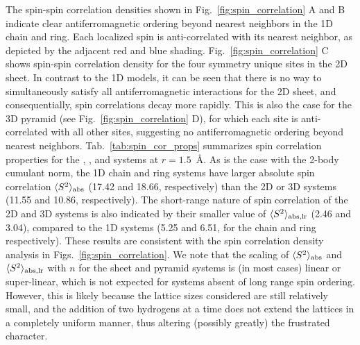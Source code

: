 \documentclass[aip,jcp,amsmath,amssymb, reprint]{revtex4-1}
\begin{document}
The spin-spin correlation densities shown in Fig.~\ref{fig:spin_correlation} A and B indicate clear  antiferromagnetic ordering beyond nearest neighbors in the 1D chain and ring.
Each localized spin is anti-correlated with its nearest neighbor, as depicted by the adjacent red and blue shading. 
Fig.~\ref{fig:spin_correlation} C shows spin-spin correlation density for the four symmetry unique sites in the 2D sheet. 
In contrast to the 1D models, it can be seen that there is no way to simultaneously satisfy all antiferromagnetic interactions for the 2D sheet, and consequentially, spin correlations decay more rapidly. 
This is also the case for the 3D pyramid (see Fig.~\ref{fig:spin_correlation} D), for which each site is anti-correlated with all other sites, suggesting no antiferromagnetic ordering beyond nearest neighbors.
Tab.~\ref{tab:spin_cor_props} summarizes spin correlation properties for the , , and  systems at $r=1.5$~{\AA}. 
As is the case with the 2-body cumulant norm, the  1D chain and ring systems have larger absolute spin correlation $\langle S^2 \rangle_{\rm{abs}}$ (17.42 and 18.66, respectively) than the 2D or 3D systems (11.55 and 10.86, respectively).
The short-range nature of spin correlation of the 2D and 3D   systems is also indicated by their smaller value of  $\langle S^2 \rangle_{\rm{abs,lr}}$ (2.46 and 3.04), compared to the 1D systems (5.25 and 6.51, for the chain and ring respectively).
These results are consistent with the spin correlation density analysis in Figs.~\ref{fig:spin_correlation}.
We note that the scaling of $\langle S^2 \rangle_{\rm{abs}}$ and $\langle S^2 \rangle_{\rm{abs,lr}}$ with $n$ for the sheet and pyramid systems is (in most cases) linear or super-linear, which is not expected for systems absent of long range spin ordering. 
However, this is likely because the lattice sizes considered are still relatively small, and the addition of two hydrogens at a time does not extend the lattices in a completely uniform manner, thus altering (possibly greatly) the frustrated character. 
\end{document}

